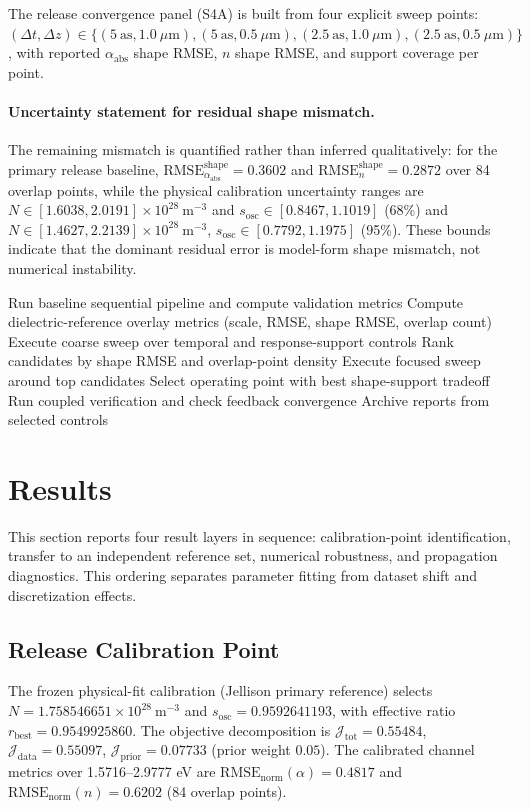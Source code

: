 \documentclass[aps,pra,twocolumn,reprint,superscriptaddress,nofootinbib]{revtex4-2}
\begin{document}
The release convergence panel (S4A) is built from four explicit sweep points:
$(\Delta t,\Delta z)\in\{(5~\mathrm{as},1.0~\mu\mathrm{m}),
(5~\mathrm{as},0.5~\mu\mathrm{m}),
(2.5~\mathrm{as},1.0~\mu\mathrm{m}),
(2.5~\mathrm{as},0.5~\mu\mathrm{m})\}$,
with reported $\alpha_{\mathrm{abs}}$ shape RMSE, $n$ shape RMSE, and support
coverage per point.

\paragraph{Uncertainty statement for residual shape mismatch.}
The remaining mismatch is quantified rather than inferred qualitatively:
for the primary release baseline,
$\mathrm{RMSE}^{\mathrm{shape}}_{\alpha_{\mathrm{abs}}}=0.3602$ and
$\mathrm{RMSE}^{\mathrm{shape}}_{n}=0.2872$ over 84 overlap points, while the
physical calibration uncertainty ranges are
$N\in[1.6038,2.0191]\times10^{28}~\mathrm{m^{-3}}$ and
$s_{\mathrm{osc}}\in[0.8467,1.1019]$ (68\%) and
$N\in[1.4627,2.2139]\times10^{28}~\mathrm{m^{-3}}$,
$s_{\mathrm{osc}}\in[0.7792,1.1975]$ (95\%). These bounds indicate that the
dominant residual error is model-form shape mismatch, not numerical instability.

\begin{algorithm}[t]
\caption{Validation and tuning protocol}
Run baseline sequential pipeline and compute validation metrics\;
Compute dielectric-reference overlay metrics (scale, RMSE, shape RMSE, overlap count)\;
Execute coarse sweep over temporal and response-support controls\;
Rank candidates by shape RMSE and overlap-point density\;
Execute focused sweep around top candidates\;
Select operating point with best shape-support tradeoff\;
Run coupled verification and check feedback convergence\;
Archive reports from selected controls\;
\end{algorithm}

\section{Results}
This section reports four result layers in sequence: calibration-point
identification, transfer to an independent reference set, numerical robustness,
and propagation diagnostics. This ordering separates parameter fitting from
dataset shift and discretization effects.

\subsection{Release Calibration Point}
The frozen physical-fit calibration (Jellison primary reference) selects
$N=1.758546651\times10^{28}~\mathrm{m^{-3}}$ and
$s_{\mathrm{osc}}=0.9592641193$, with effective ratio
$r_{\mathrm{best}}=0.9549925860$. The objective decomposition is
$\mathcal{J}_{\mathrm{tot}}=0.55484$,
$\mathcal{J}_{\mathrm{data}}=0.55097$,
$\mathcal{J}_{\mathrm{prior}}=0.07733$ (prior weight $0.05$).
The calibrated channel metrics over 1.5716--2.9777 eV are
$\mathrm{RMSE}_{\mathrm{norm}}(\alpha)=0.4817$ and
$\mathrm{RMSE}_{\mathrm{norm}}(n)=0.6202$ (84 overlap points).
\end{document}
